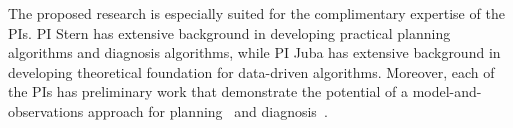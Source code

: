 \documentclass[12pt]{article}
\newcommand{\note}[1]{\textbf{\textit{#1}}}
\begin{document}
The proposed research is especially suited for the complimentary expertise of the PIs. %
PI Stern has extensive background in developing practical planning algorithms and diagnosis algorithms, while PI Juba has extensive background in developing theoretical foundation for data-driven algorithms. 
Moreover, each of the PIs has preliminary work that demonstrate the potential of a model-and-observations approach for planning~\cite{stern2011probably,stern2012exploring,juba2016jmlr} and diagnosis~\cite{elmishali2016dataAugmented, juba2016aaai}.
\end{document}
